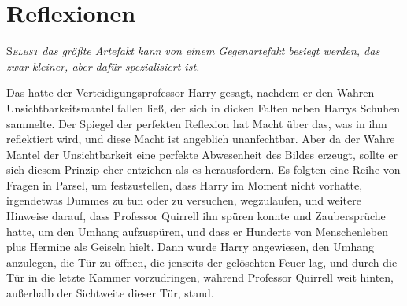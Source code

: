 \chapter{Reflexionen}

\lettrine{S}{\emph{elbst}} \emph{das größte Artefakt kann von einem Gegenartefakt besiegt werden, das zwar kleiner, aber dafür spezialisiert ist.}

Das hatte der Verteidigungsprofessor Harry gesagt, nachdem er den Wahren Unsichtbarkeitsmantel fallen ließ, der sich in dicken Falten neben Harrys Schuhen sammelte.
Der Spiegel der perfekten Reflexion hat Macht über das, was in ihm reflektiert wird, und diese Macht ist angeblich unanfechtbar. Aber da der Wahre Mantel der Unsichtbarkeit eine perfekte Abwesenheit des Bildes erzeugt, sollte er sich diesem Prinzip eher entziehen als es herausfordern.
Es folgten eine Reihe von Fragen in Parsel, um festzustellen, dass Harry im Moment nicht vorhatte, irgendetwas Dummes zu tun oder zu versuchen, wegzulaufen, und weitere Hinweise darauf, dass Professor Quirrell ihn spüren konnte und Zaubersprüche hatte, um den Umhang aufzuspüren, und dass er Hunderte von Menschenleben plus Hermine als Geiseln hielt.
Dann wurde Harry angewiesen, den Umhang anzulegen, die Tür zu öffnen, die jenseits der gelöschten Feuer lag, und durch die Tür in die letzte Kammer vorzudringen, während Professor Quirrell weit hinten, außerhalb der Sichtweite dieser Tür, stand.

